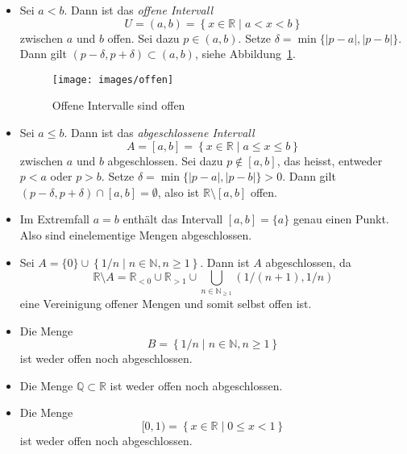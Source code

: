 \documentclass[../main.tex]{subfiles}
\begin{document}
\begin{examples}
  \leavevmode
  \begin{itemize}
    \item Sei
      $a < b$. Dann ist
      das \emph{offene Intervall}
      \[
        U = (a, b) = \left\{x \in \mathbb{R} \mid a < x < b\right\}
      \]
      zwischen $a$ und $b$ offen. Sei dazu $p \in (a, b)$. Setze
      $\delta = \min \{|p - a|, |p - b|\}$.
      Dann gilt
      $(p - \delta, p + \delta) \subset (a, b)$,
      siehe Abbildung~\ref{fig:offen}.
      \begin{figure}[htb]
        \centering
        \texttt{[image: images/offen]}
        \caption{Offene Intervalle
        sind offen}%
        \label{fig:offen}
      \end{figure}
      
    \item Sei $a \leq b$. Dann ist das \emph{abgeschlossene Intervall}
      \[
        A = [a, b] = \left\{x \in \mathbb{R} \mid a \leq x \leq b\right\}
      \]
      zwischen $a$ und $b$ abgeschlossen.
      Sei dazu $p \notin [a,b]$, das heisst, entweder
      $p < a$ oder $p > b$.
      Setze $\delta = \min \{|p- a|, |p-b|\} > 0$.
      Dann gilt
      $(p - \delta, p + \delta) \cap [a, b] = \emptyset$,
      also ist $\mathbb{R} \setminus [a, b]$ offen.
    \item Im Extremfall $a = b$ enthält das Intervall
      $[a,b] = \{a\}$ genau einen Punkt. Also
      sind einelementige Mengen abgeschlossen.
    \item Sei $A = \{0\} \cup \left\{1/n \mid n \in 
      \mathbb{N}, n \geq 1\right\}$.
      Dann ist $A$ abgeschlossen, da
      \[
        \mathbb{R} \setminus A = \mathbb{R}_{<0} \cup
        \mathbb{R}_{>1} \cup \bigcup_{n \in \mathbb{N}_{\geq 1}}
        \left(1/(n+1), 1/n\right)
      \]
      eine Vereinigung offener Mengen und somit selbst offen ist.
    \item Die Menge
      \[
        B = \left\{1/n \mid n \in \mathbb{N}, n \geq 1\right\}
      \]
      ist weder offen noch abgeschlossen.
    \item Die Menge $\mathbb{Q} \subset \mathbb{R}$ 
      ist weder offen noch abgeschlossen.
    \item Die Menge
      \[
        [0, 1) = \left\{x \in \mathbb{R} \mid 0 \leq%
        x < 1\right\}
      \]
      ist weder offen noch abgeschlossen.
  \end{itemize}
\end{examples}
\end{document}
